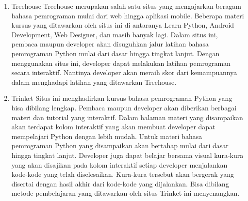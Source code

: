 \begin{enumerate}
\item Treehouse
Treehouse merupakan salah satu situs yang mengajarkan 
beragam bahasa pemrograman mulai dari web hingga aplikasi 
mobile. Beberapa materi kursus yang ditawarkan oleh 
situs ini di antaranya Learn Python, Android Development, 
Web Designer, dan masih banyak lagi. 
Dalam situs ini, pembaca maupun developer akan disuguhkan 
jalur latihan bahasa pemrograman Python mulai dari 
dasar hingga tingkat lanjut. Dengan menggunakan situs 
ini, developer dapat melakukan latihan pemrograman secara 
interaktif. 
Nantinya developer akan meraih skor dari kemampuannya 
dalam menghadapi latihan yang ditawarkan Treehouse.

\item Trinket 
Situs ini menghadirkan kursus bahasa pemrograman Python 
yang bisa dibilang lengkap. Pembaca maupun developer 
akan diberikan berbagai materi dan tutorial yang interaktif. 
Dalam halaman materi yang disampaikan akan terdapat 
kolom interaktif yang akan membuat developer dapat mempelajari 
Python dengan lebih mudah. 
Untuk materi bahasa pemrograman Python yang disampaikan 
akan bertahap mulai dari dasar hingga tingkat lanjut. 
Developer juga dapat belajar bersama visual kura-kura 
yang akan disajikan pada kolom interaktif setiap developer 
menjalankan kode-kode yang telah diselesaikan. 
Kura-kura tersebut akan bergerak yang disertai dengan 
hasil akhir dari kode-kode yang dijalankan. Bisa dibilang 
metode pembelajaran yang ditawarkan oleh situs Trinket ini 
menyenangkan.
\end{enumerate}


